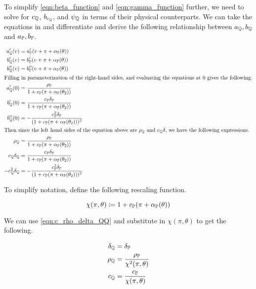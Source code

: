 \documentclass[11pt, letterpaper, twoside, final]{article}
\begin{document}
To simplify \cref{eqn:beta_function} and \cref{eqn:gamma_function} further, we need to solve for $c_{\mathbb{Q}}$,
$b_{c_{\mathbb{Q}}}$, and $\psi_{\mathbb{Q}}$  in terms of their physical counterparts.
We can take the equations in \textcite[Proposition 5]{khrapov2016affine} and differentiate and derive the
following relationship between $a_{\mathbb{Q}}, b_{\mathbb{Q}}$ and $a_{\mathbb{P}}, b_{\mathbb{P}}$.

\begin{align}
    a_{\QQ}'(v) &= a_{\PP}'(v + \pi + \alpha_{\PP}(\theta))  \nonumber \\
%
    b_{\QQ}'(v) &= b_{\PP}'(v + \pi + \alpha_{\PP}(\theta))  \\
%
    b_{\QQ}''(v) &= b_{\PP}''(v + \pi + \alpha_{\PP}(\theta))  \nonumber \\
%
    \intertext{Filling in parameterization of the right-hand sides, and evaluating the equations at $0$ gives the
    following.} 
%
    a_{\QQ}'(0) &= \frac{\rho_{\PP}}{1 + c_{\PP}(\pi + \alpha_{\PP}(\theta_2))} \nonumber \\
%
    b_{\QQ}'(0) &= \frac{c_{\PP} \delta_{\PP}}{1 + c_{\PP}(\pi + \alpha_{\PP}(\theta_2))} \\
%
    b_{\QQ}''(0) &= -\frac{c_{\PP}^2 \delta_{\PP}}{(1 + c_{\PP}(\pi + \alpha_{\PP}(\theta_2)))^2} \nonumber \\
%
    \intertext{Then since the left hand sides of the equation above are $\rho_{\QQ}$ and $c_{\QQ} \delta$, we
    have the following expressions.}
%
    \rho_{\QQ} &= \frac{\rho_{\PP}}{1 + c_{\PP}(\pi + \alpha_{\PP}(\theta_2))} \nonumber \\
%
    \label{eqn:c_rho_delta_QQ}
    c_{\QQ} \delta_{\QQ} &= \frac{c_{\PP} \delta_{\PP}}{1 + c_{\PP}(\pi + \alpha_{\PP}(\theta_2))}  \\
%
    -c_{\QQ}^2 \delta_{\QQ} &= -\frac{c_{\PP}^2 \delta_{\PP}}{(1 + c_{\PP}(\pi + \alpha_{\PP}(\theta_2)))^2}
    \nonumber
\end{align}

To simplify notation, define the following rescaling function.

\begin{equation}
    \chi(\pi, \theta) \coloneqq 1 + c_{\mathbb{P}}(\pi + \alpha_{\mathbb{P}}(\theta))
\end{equation}

We can use \cref{eqn:c_rho_delta_QQ} and substitute in $\chi(\pi, \theta)$ to get the following.

\begin{align}
    \delta_{\mathbb{Q}} &= \delta_{\mathbb{P}} \\
    \rho_{\mathbb{Q}} &= \frac{\rho_{\mathbb{P}}}{\chi^2(\pi, \theta)} \\
    c_{\mathbb{Q}} &= \frac{c_{\mathbb{P}}}{\chi(\pi, \theta)} 
\end{align}
\end{document}
